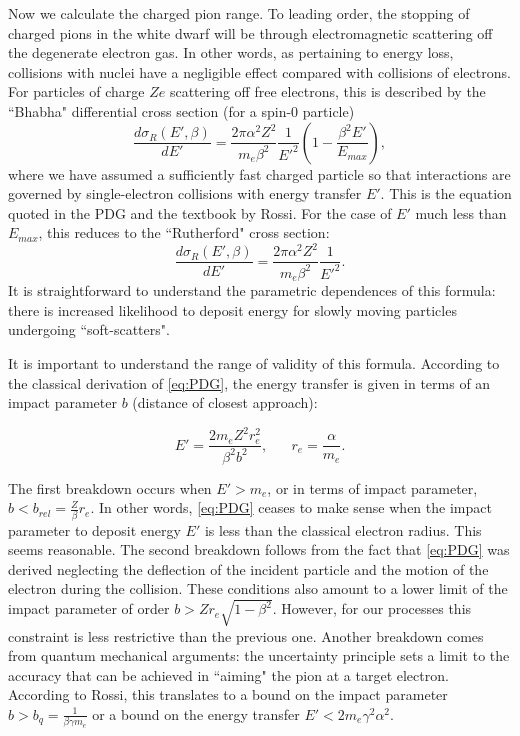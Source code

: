 \documentclass[11 pt, preprint,preprintnumbers,amsmath,amssymb, prd]{revtex4}
\begin{document}
Now we calculate the charged pion range. To leading order, the stopping of charged pions in the white dwarf will be through electromagnetic scattering off the degenerate electron gas. In other words, as pertaining to energy loss, collisions with nuclei have a negligible effect compared with collisions of electrons. For particles of charge $Ze$ scattering off free electrons, this is described by the ``Bhabha" differential cross section (for a spin-0 particle)
\begin{equation}
\label{eq:PDG}
\frac{d \sigma_R (E', \beta)}{dE'}= \frac{2 \pi  \alpha^2 Z^2}{m_e \beta^2} \frac{1}{E'^2} \left(1- \frac{\beta^2 E'}{E_{max}}\right),
\end{equation}
where we have assumed a sufficiently fast charged particle so that interactions are governed by single-electron collisions with energy transfer $E'$. This is the equation quoted in the PDG and the textbook by Rossi. For the case of $E'$ much less than $E_{max}$, this reduces to the ``Rutherford" cross section:
\begin{equation}
\label{eq:PDG}
\frac{d \sigma_R (E', \beta)}{dE'}= \frac{2 \pi  \alpha^2 Z^2}{m_e \beta^2}  \frac{1}{E'^2}. 
\end{equation}
It is straightforward to understand the parametric dependences of this formula: there is increased likelihood to deposit energy for slowly moving particles undergoing ``soft-scatters".  

It is important to understand the range of validity of this formula. According to the classical derivation of \ref{eq:PDG}, the energy transfer is given in terms of an impact parameter $b$ (distance of closest approach):

\begin{equation}
E' = \frac{2 m_e Z^2 r_e^2}{\beta^2 b^2}, \hspace{20pt} r_e = \frac{\alpha}{m_e}. 
\end{equation}

The first breakdown occurs when $E' > m_e$, or in terms of impact parameter, $b< b_{rel} = \frac{Z}{\beta} r_e$. In other words, \ref{eq:PDG} ceases to make sense when the impact parameter to deposit energy $E'$ is less than the classical electron radius. This seems reasonable. The second breakdown follows from the fact that \ref{eq:PDG} was derived neglecting the deflection of the incident particle and the motion of the electron during the collision. These conditions also amount to a lower limit of the impact parameter of order $b > Z r_e \sqrt{1-\beta^2}$. However, for our processes this constraint is less restrictive than the previous one. Another breakdown comes from quantum mechanical arguments: the uncertainty principle sets a limit to the accuracy that can be achieved in ``aiming" the pion at a target electron. According to Rossi, this translates to a bound on the impact parameter $b > b_q = \frac{1}{\beta \gamma m_e}$ or a bound on the energy transfer $E' < 2 m_e \gamma^2 \alpha^2$. 
\end{document}
